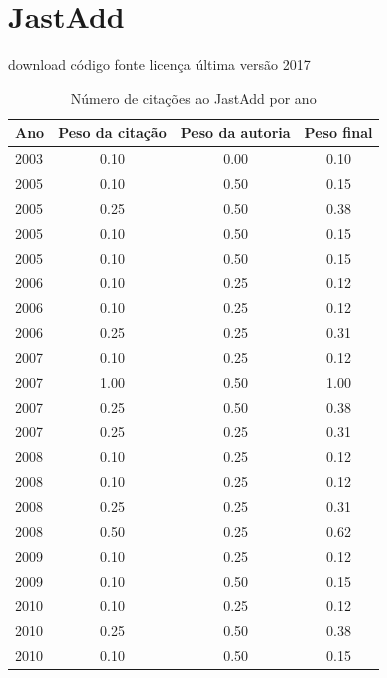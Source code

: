 \section{JastAdd}
\checkmark download
\checkmark código fonte
\checkmark licença
\checkmark última versão 2017
\begin{table}[H]
\caption{Número de citações ao JastAdd por ano}
\centering
\begin{tabular}{| l | c | c | c |}
  \hline
  Ano & Peso da citação & Peso da autoria & Peso final \\
  \hline
  2003
    & 0.10
    & 0.00
    & {\color{red} 0.10} \\
\hline
  2005
    & 0.10
    & 0.50
    & {\color{red} 0.15} \\
  2005
    & 0.25
    & 0.50
    & {\color{red} 0.38} \\
  2005
    & 0.10
    & 0.50
    & {\color{red} 0.15} \\
  2005
    & 0.10
    & 0.50
    & {\color{red} 0.15} \\
\hline
  2006
    & 0.10
    & 0.25
    & {\color{red} 0.12} \\
  2006
    & 0.10
    & 0.25
    & {\color{red} 0.12} \\
  2006
    & 0.25
    & 0.25
    & {\color{red} 0.31} \\
\hline
  2007
    & 0.10
    & 0.25
    & {\color{red} 0.12} \\
  2007
    & 1.00
    & 0.50
    & {\color{blue} 1.00} \\
  2007
    & 0.25
    & 0.50
    & {\color{red} 0.38} \\
  2007
    & 0.25
    & 0.25
    & {\color{red} 0.31} \\
\hline
  2008
    & 0.10
    & 0.25
    & {\color{red} 0.12} \\
  2008
    & 0.10
    & 0.25
    & {\color{red} 0.12} \\
  2008
    & 0.25
    & 0.25
    & {\color{red} 0.31} \\
  2008
    & 0.50
    & 0.25
    & {\color{blue} 0.62} \\
\hline
  2009
    & 0.10
    & 0.25
    & {\color{red} 0.12} \\
  2009
    & 0.10
    & 0.50
    & {\color{red} 0.15} \\
\hline
  2010
    & 0.10
    & 0.25
    & {\color{red} 0.12} \\
  2010
    & 0.25
    & 0.50
    & {\color{red} 0.38} \\
  2010
    & 0.10
    & 0.50
    & {\color{red} 0.15} \\

\end{tabular}
\end{table}
